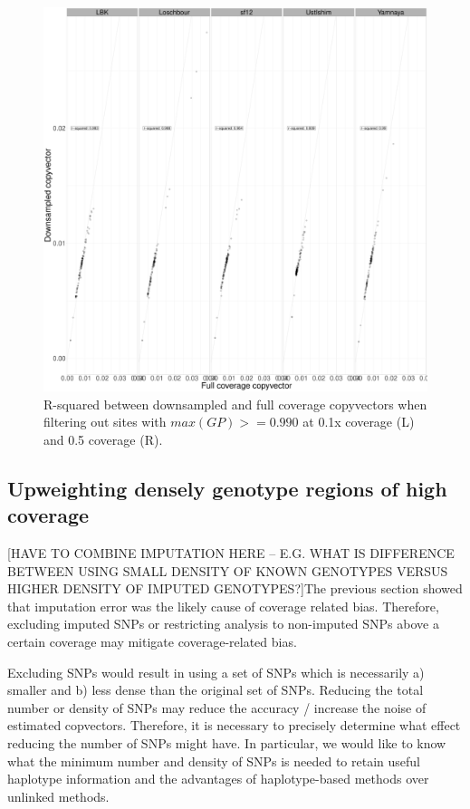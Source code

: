 \begin{figure}[htp]
    \centering
    \includegraphics[width=1.0\textwidth]{../images/chapter1/CP_correlation_allSamples_0.1x_0.5x_30x.GP_filter.pdf}
    \caption{R-squared between downsampled and full coverage copyvectors when filtering out sites with $max(GP) >= 0.990$ at 0.1x coverage (L) and 0.5 coverage (R).}
    \label{fig:CP_correlation_allSamples_0.1x_0.5x_30x.GP_filter}
\end{figure}


\subsection{Upweighting densely genotype regions of high coverage}

{\color{red}[HAVE TO COMBINE IMPUTATION HERE -- E.G. WHAT IS DIFFERENCE BETWEEN USING SMALL DENSITY OF KNOWN GENOTYPES VERSUS HIGHER DENSITY OF IMPUTED GENOTYPES?]}The previous section showed that imputation error was the likely cause of coverage related bias. Therefore, excluding imputed SNPs or restricting analysis to non-imputed SNPs above a certain coverage may mitigate coverage-related bias.

Excluding SNPs would result in using a set of SNPs which is necessarily a) smaller and b) less dense than the original set of SNPs. Reducing the total number or density of SNPs may reduce the accuracy / increase the noise of estimated copvectors. Therefore, it is necessary to precisely determine what effect reducing the number of SNPs might have. In particular, we would like to know what the minimum number and density of SNPs is needed to retain useful haplotype information and the advantages of haplotype-based methods over unlinked methods. 

